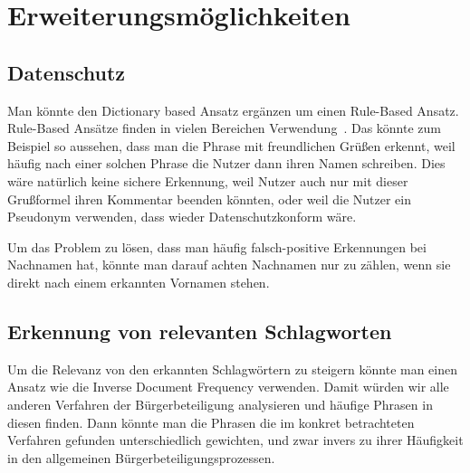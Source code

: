 \documentclass[runningheads]{llncs}
\begin{document}
\section{Erweiterungsmöglichkeiten}
	\subsection{Datenschutz}
		Man könnte den Dictionary based Ansatz ergänzen um einen Rule-Based Ansatz.
		Rule-Based Ansätze finden in vielen Bereichen Verwendung~\cite{mahmud2015rule}.
		Das könnte zum Beispiel so aussehen, dass man die Phrase \glqq mit freundlichen Grüßen\grqq{} erkennt, weil häufig nach einer solchen Phrase die Nutzer dann ihren Namen schreiben.
		Dies wäre natürlich keine sichere Erkennung, weil Nutzer auch nur mit dieser Grußformel ihren Kommentar beenden könnten, oder weil die Nutzer ein Pseudonym verwenden, dass wieder Datenschutzkonform wäre.
		
		Um das Problem zu lösen, dass man häufig falsch-positive Erkennungen bei Nachnamen hat, könnte man darauf achten Nachnamen nur zu zählen, wenn sie direkt nach einem erkannten Vornamen stehen.
	\subsection{Erkennung von relevanten Schlagworten}
		Um die Relevanz von den erkannten Schlagwörtern zu steigern könnte man einen Ansatz wie die Inverse Document Frequency verwenden.
		Damit würden wir alle anderen Verfahren der Bürgerbeteiligung analysieren und häufige Phrasen in diesen finden.
		Dann könnte man die Phrasen die im konkret betrachteten Verfahren gefunden unterschiedlich gewichten, und zwar invers zu ihrer Häufigkeit in den allgemeinen Bürgerbeteiligungsprozessen. %

	
	
\end{document}
